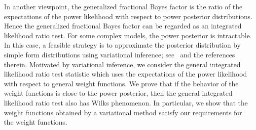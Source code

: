 \documentclass[11pt]{article}
\theoremstyle{plain}
\theoremstyle{definition}
\theoremstyle{remark}
\begin{document}




In another viewpoint,
the generalized fractional Bayes factor is the ratio of the expectations of the power likelihood with respect to power posterior distributions.
Hence the generalized fractional Bayes factor can be regarded as an integrated likelihood ratio test.
For some complex models, the power posterior is intractable.
In this case, 
a feasible strategy is to approximate the posterior distribution by simple form distributions using variational inference; see~\cite{Blei2017} and the references therein.
Motivated by variational inference, we consider the general integrated likelihood ratio test statistic which uses the expectations of the power likelihood with respect to general weight functions.
We prove that if the behavior of the weight functions is close to the power posterior, then the general integrated likelihood ratio test also has Wilks phenomenon.
In particular, we show that the weight functions obtained by a variational method satisfy our requirements for the weight functions.
\end{document}
